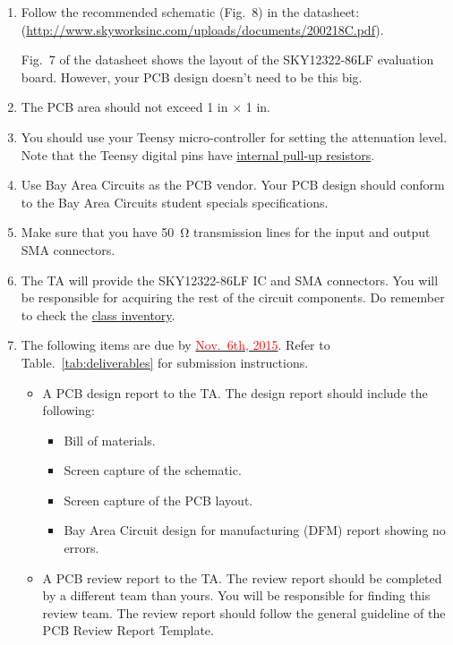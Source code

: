\documentclass[letterpaper, 11pt]{article}
\newcommand{\due}[1]{\href{https://github.com/ucdart/UCD-EEC134/blob/master/support/schedule/eec134-schedule.pdf}{\textcolor{red}{#1}}}
\begin{document}
\begin{enumerate}
	\item Follow the recommended schematic (Fig.~8) in the datasheet:\\ (\url{http://www.skyworksinc.com/uploads/documents/200218C.pdf}). 
	
	Fig.~7 of the datasheet shows the layout of the SKY12322-86LF evaluation board. However, your PCB design doesn't need to be this big.

	\item The PCB area should not exceed 1 in $\times$ 1 in.	

	\item You should use your Teensy micro-controller for setting the attenuation level. Note that the Teensy digital pins have \href{https://www.pjrc.com/teensy/td_digital.html}{internal pull-up resistors}. 
	
	\item Use Bay Area Circuits as the PCB vendor. Your PCB design should conform to the Bay Area Circuits student specials specifications. 
	
	\item Make sure that you have \SI{50}{\ohm} transmission lines for the input and output SMA connectors.
	
	\item The TA will provide the SKY12322-86LF IC and SMA connectors. You will be responsible for acquiring the rest of the circuit components. Do remember to check the \href{https://docs.google.com/spreadsheets/d/1GJnBLUymuVzXjrK0Zkdbc2lwTbw0z9a0JR4bLLzO-Sw/edit#gid=4}{class inventory}. 
	
	\item The following items are due by \due{Nov.~6th, 2015}. Refer to Table.~\ref{tab:deliverables} for submission instructions. 
		\begin{itemize}
			\item A PCB design report to the TA. The design report should include the following:
				\begin{itemize}
					\item Bill of materials.
					\item Screen capture of the schematic.
					\item Screen capture of the PCB layout.
					\item Bay Area Circuit design for manufacturing (DFM) report showing no errors.
				\end{itemize}
			\item A PCB review report to the TA. The review report should be completed by a different team than yours. You will be responsible for finding this review team. The review report should follow the general guideline of the PCB Review Report Template.
			

\end{itemize}
\end{enumerate}
\end{document}
